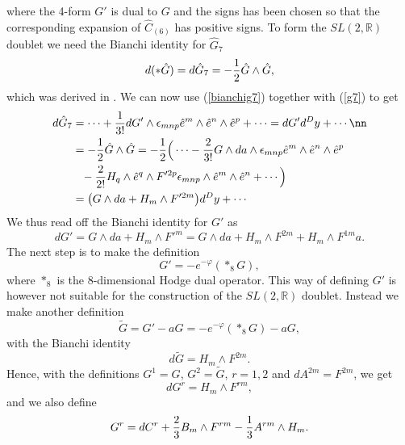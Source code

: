 where the 4-form $G'$ is dual to $G$ and the signs has been chosen so that the corresponding expansion of $\hat C_{(6)}$ has positive signs. To form the $SL(2,{\mathbb R})$ doublet we need the Bianchi identity for $\hat{G}_7$
\begin{equation}
d(*\hat{G})=d{\hat{G}_7}=-{1 \over 2}\hat{G} \wedge \hat{G},
\label{bianchig7}
\end{equation}
which was derived in . We can now use (\ref{bianchig7}) together with (\ref{g7}) to get
\begin{align}
d\hat{G}_7 &= \cdots +{1 \over 3!} dG' \wedge {\epsilon}_{mnp}
\hat{e}^m \wedge \hat{e}^n \wedge \hat{e}^p + \cdots = dG' d^Dy + \cdots\nn\\
& = -{1 \over 2}\hat{G} \wedge \hat{G}
= -{1 \over 2}\Big( \cdots -{2 \over 3!} G \wedge da \wedge
{\epsilon}_{mnp}\hat{e}^m \wedge \hat{e}^n \wedge \hat{e}^p \nonumber
\\
&\phantom{=}-{2 \over 2!} H_q \wedge \hat{e}^q \wedge F'^{2p} {\epsilon}_{mnp}\wedge \hat{e}^m \wedge \hat{e}^n + \cdots\Big) \nonumber \\
&= \big( G \wedge da + H_m\wedge F'^{2m}\big) d^Dy + \cdots
\end{align}
We thus read off the Bianchi identity for $G'$ as
\begin{equation}
dG'=G \wedge da + H_m \wedge F'^m = G \wedge da + H_m \wedge F^{2m} + H_m \wedge F^{1m}a.
\end{equation}
The next step is to make the definition
\begin{equation}
G' = -e^{-\varphi}(*_8 G),
\end{equation}
where $*_8$ is the 8-dimensional Hodge dual operator. This way of defining $G'$ is however not 
suitable for the construction of the $SL(2,{\mathbb R})$ doublet. Instead we make another definition
\begin{equation}
\tilde{G}=G'-aG=-e^{-\varphi}(*_8 G)-aG,
\end{equation}
with the Bianchi identity
\begin{equation}
d\tilde{G}=H_m \wedge F^{2m}.
\end{equation}
Hence, with the definitions $G^1 = G$, $G^2 = \tilde{G}$, $r = 1,2$ and $dA^{2m}=F^{2m}$, we get
\begin{equation}
dG^r=H_m \wedge F^{rm},
\end{equation}
and we also define
\begin{equation}
G^r=dC^r+{2 \over 3}B_m \wedge F^{rm} - {1 \over 3}A^{rm} \wedge H_m.
\end{equation}
